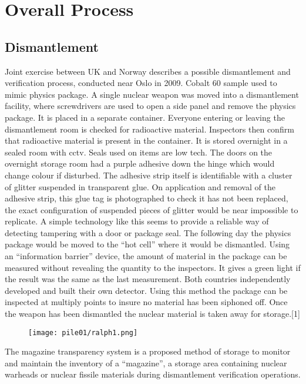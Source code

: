 \documentclass[a4paper]{article}
\begin{document}
\section{Overall Process}
\subsection{Dismantlement}
Joint exercise between UK and Norway describes a possible dismantlement and 
verification process, conducted near Oslo in 2009. Cobalt 60 sample used to 
mimic physics package. A single nuclear weapon was moved into a dismantlement 
facility, where screwdrivers are used to open a side panel and remove the 
physics package. It is placed in a separate container. Everyone entering or 
leaving the dismantlement room is checked for radioactive material. Inspectors 
then confirm that radioactive material is present in the container. It is stored 
overnight in a sealed room with cctv. Seals used on items are low tech. The doors 
on the overnight storage room had a purple adhesive down the hinge which would 
change colour if disturbed. The adhesive strip itself is identifiable with a 
cluster of glitter suspended in transparent glue. On application and removal of 
the adhesive strip, this glue tag is photographed to check it has not been 
replaced, the exact configuration of suspended pieces of glitter would be near 
impossible to replicate. A simple technology like this seems to provide a reliable 
way of detecting tampering with a door or package seal. The following day the 
physics package would be moved to the ``hot cell'' where it would be dismantled. 
Using an ``information barrier'' device, the amount of material in the package can 
be measured without revealing the quantity to the inspectors. It gives a green 
light if the result was the same as the last measurement. Both countries 
independently developed and built their own detector. Using this method the 
package can be inspected at multiply points to insure no material has been 
siphoned off. Once the weapon has been dismantled the nuclear material is taken 
away for storage.[1]

\begin{figure}[h!]
  \texttt{[image: pile01/ralph1.png]}
\end{figure}

The magazine transparency system is a proposed method of storage to monitor and 
maintain the inventory of a ``magazine'', a storage area containing nuclear warheads 
or nuclear fissile materials during dismantlement verification operations. 
\end{document}
